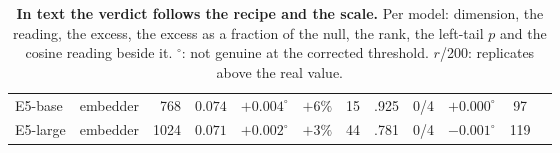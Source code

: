 \begin{table}[H]
\begin{tabular}{llrccccccc|cc}
E5-base & embedder & 768 & $0.074$ & $+0.004^{\circ}$ & $+6\%$ & 15 & .925 & 0/4 & $+0.000^{\circ}$ & 97 \\
E5-large & embedder & 1024 & $0.071$ & $+0.002^{\circ}$ & $+3\%$ & 44 & .781 & 0/4 & $-0.001^{\circ}$ & 119 \\
\bottomrule
\end{tabular}
\par\vspace{2pt}
\endgroup
\caption{\textbf{In text the verdict follows the recipe and the scale.} Per model: dimension, the reading, the excess, the excess as a fraction of the null, the rank, the left-tail $p$ and the cosine reading beside it. $^{\circ}$: not genuine at the corrected threshold. $r$/200: replicates above the real value.
}
\label{tab:q2-text}
\end{table}
